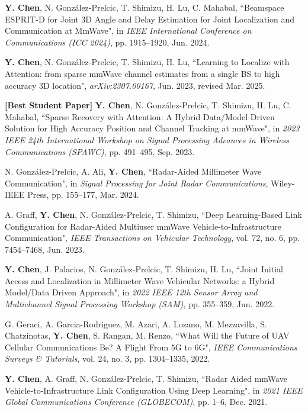 \documentclass[letterpaper,10pt]{article}
\newcommand{\resumeItem}[2]{
  \item\small{
    \textbf{#1}{#2 \vspace{-2pt}}
  }
}
\newcommand{\resumeSubItem}[2]{\resumeItem{#1}{#2}\vspace{-2pt}}
\begin{document}
  \resumeSubItem{}{\textbf{Y. Chen}, N. Gonz\'{a}lez-Prelcic, T. Shimizu, H. Lu, C. Mahabal, ``Beamspace ESPRIT-D for Joint 3D Angle and Delay Estimation for Joint Localization and Communication at MmWave", in \emph{IEEE International Conference on Communications (ICC 2024)}, pp. 1915--1920, Jun. 2024.}\label{pub:C5}

  \resumeSubItem{}{\textbf{Y. Chen}, N. Gonz\'{a}lez-Prelcic, T. Shimizu, H. Lu, ``Learning to Localize with Attention: from sparse mmWave channel estimates from a single BS to high accuracy 3D location", \emph{arXiv:2307.00167}, Jun. 2023, revised Mar. 2025.}\label{pub:J2}

  \resumeSubItem{}{\textbf{[Best Student Paper]} \textbf{Y. Chen}, N. Gonz\'{a}lez-Prelcic, T. Shimizu, H. Lu, C. Mahabal, ``Sparse Recovery with Attention: A Hybrid Data/Model Driven Solution for High Accuracy Position and Channel Tracking at mmWave", in \emph{2023 IEEE 24th International Workshop on Signal Processing Advances in Wireless Communications (SPAWC)}, pp. 491--495, Sep. 2023.}\label{pub:C4}

  \resumeSubItem{}{N. Gonz\'{a}lez-Prelcic, A. Ali, \textbf{Y. Chen}, ``Radar-Aided Millimeter Wave Communication", in \emph{Signal Processing for Joint Radar Communications}, Wiley-IEEE Press, pp. 155--177, Mar. 2024.}\label{pub:B1}

  \resumeSubItem{}{A. Graff, \textbf{Y. Chen}, N. Gonz\'{a}lez-Prelcic, T. Shimizu, ``Deep Learning-Based Link Configuration for Radar-Aided Multiuser mmWave Vehicle-to-Infrastructure Communication", \emph{IEEE Transactions on Vehicular Technology}, vol. 72, no. 6, pp. 7454--7468, Jun. 2023.}\label{pub:J1}

  \resumeSubItem{}{\textbf{Y. Chen}, J. Palacios, N. Gonz\'{a}lez-Prelcic, T. Shimizu, H. Lu, ``Joint Initial Access and Localization in Millimeter Wave Vehicular Networks: a Hybrid Model/Data Driven Approach", in \emph{2022 IEEE 12th Sensor Array and Multichannel Signal Processing Workshop (SAM)}, pp. 355--359, Jun. 2022.}\label{pub:C3}

  \resumeSubItem{}{G. Geraci, A. Garcia-Rodriguez, M. Azari, A. Lozano, M. Mezzavilla, S. Chatzinotas, \textbf{Y. Chen}, S. Rangan, M. Renzo, ``What Will the Future of UAV Cellular Communications Be? A Flight From 5G to 6G", \emph{IEEE Communications Surveys \& Tutorials}, vol. 24, no. 3, pp. 1304--1335, 2022.}\label{pub:S1}

  \resumeSubItem{}{\textbf{Y. Chen}, A. Graff, N. Gonz\'{a}lez-Prelcic, T. Shimizu, ``Radar Aided mmWave Vehicle-to-Infrastructure Link Configuration Using Deep Learning", in \emph{2021 IEEE Global Communications Conference (GLOBECOM)}, pp. 1--6, Dec. 2021.}\label{pub:C2}
\end{document}
